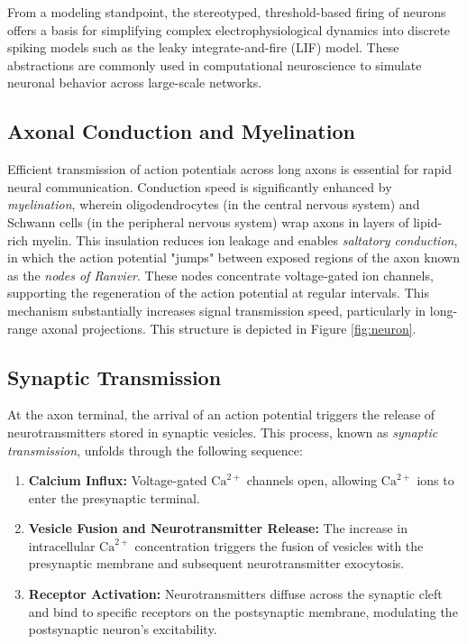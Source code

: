 From a modeling standpoint, the stereotyped, threshold-based firing of neurons offers a basis for simplifying complex electrophysiological dynamics into discrete spiking models such as the leaky integrate-and-fire (LIF) model. These abstractions are commonly used in computational neuroscience to simulate neuronal behavior across large-scale networks.

\subsection{Axonal Conduction and Myelination}
\label{subsec:axonal_conduction}

Efficient transmission of action potentials across long axons is essential for rapid neural communication. Conduction speed is significantly enhanced by \emph{myelination}, wherein oligodendrocytes (in the central nervous system) and Schwann cells (in the peripheral nervous system) wrap axons in layers of lipid-rich myelin. This insulation reduces ion leakage and enables \emph{saltatory conduction}, in which the action potential "jumps" between exposed regions of the axon known as the \emph{nodes of Ranvier}. These nodes concentrate voltage-gated ion channels, supporting the regeneration of the action potential at regular intervals. This mechanism substantially increases signal transmission speed, particularly in long-range axonal projections. This structure is depicted in Figure \ref{fig:neuron}.

\subsection{Synaptic Transmission}
\label{subsec:synaptic_transmission}

At the axon terminal, the arrival of an action potential triggers the release of neurotransmitters stored in synaptic vesicles. This process, known as \emph{synaptic transmission}, unfolds through the following sequence:

\begin{enumerate}
    \item \textbf{Calcium Influx:} Voltage-gated $\text{Ca}^{2+}$ channels open, allowing $\text{Ca}^{2+}$ ions to enter the presynaptic terminal.
    \item \textbf{Vesicle Fusion and Neurotransmitter Release:} The increase in intracellular $\text{Ca}^{2+}$ concentration triggers the fusion of vesicles with the presynaptic membrane and subsequent neurotransmitter exocytosis.
    \item \textbf{Receptor Activation:} Neurotransmitters diffuse across the synaptic cleft and bind to specific receptors on the postsynaptic membrane, modulating the postsynaptic neuron's excitability.
\end{enumerate}

